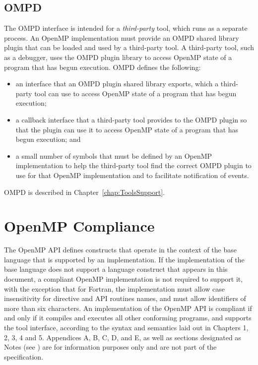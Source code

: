 \subsection{OMPD}

The OMPD interface is intended for a \emph{third-party} tool, which runs as a separate process.
An OpenMP implementation must provide an OMPD 
shared library plugin that can be loaded and used by a third-party tool. 
A third-party tool, such as a debugger, uses the OMPD  plugin library
to access
OpenMP state of a program that has begun execution.
OMPD defines the following:

\begin{itemize}
\item
  an interface that an OMPD plugin shared library exports, which a
  third-party tool can use to access OpenMP state of a program that has begun execution;
  \item
  a callback interface that a third-party tool provides to the
  OMPD plugin so that the  plugin can use it to access
 OpenMP state of a program that has begun execution; and
\item
  a small number of symbols that must be defined by an OpenMP implementation
  to help the third-party tool find the correct OMPD plugin to use
  for that OpenMP implementation and to facilitate notification
  of events.
\end{itemize}
OMPD is described in Chapter~\ref{chap:ToolsSupport}.

\section{OpenMP Compliance}
\label{sec:OpenMP Compliance}
The OpenMP API defines constructs that operate in the context of the
base language that is supported by an implementation. If the
implementation of the base language does not support a language
construct that appears in this document, a compliant OpenMP
implementation is not required to support it, with the exception that
for Fortran, the implementation must allow case insensitivity for
directive and API routines names, and must allow identifiers of more
than six characters. An implementation of the OpenMP API is compliant
if and only if it compiles and executes all other conforming programs,
and supports the tool interface, according to the syntax and semantics
laid out in Chapters 1, 2, 3, 4 and 5. Appendices A, B, C, D, and E,
as well as sections designated as Notes (see ) are for information purposes only and are not
part of the specification.


